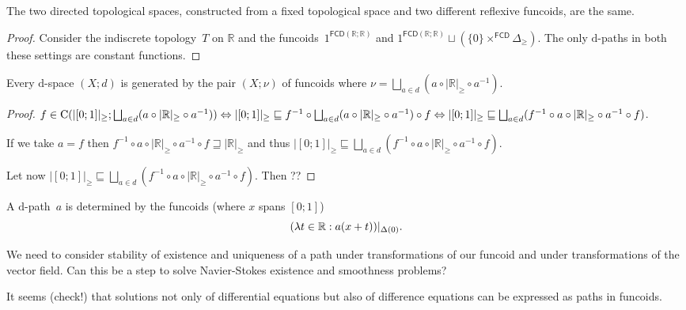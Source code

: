 \begin{example}
The two directed topological spaces, constructed from a fixed topological space and two different reflexive funcoids,
are the same.
\end{example}

\begin{proof}
Consider the indiscrete topology~$T$ on $\mathbb{R}$ and the funcoids~$1^{\mathsf{FCD}(\mathbb{R};\mathbb{R})}$
and $1^{\mathsf{FCD}(\mathbb{R};\mathbb{R})}\sqcup(\{0\}\times^{\mathsf{FCD}} \Delta_{\geq})$.
The only $\mathrm{d}$-paths in both these settings are constant functions.
\end{proof}

\begin{conjecture}
Every $\mathrm{d}$-space $(X;d)$ is generated by the pair $(X;\nu)$ of funcoids where
$\nu = \bigsqcup_{a\in d}(a\circ |\mathbb{R}|_{\geq}\circ a^{-1})$.
\end{conjecture}

\begin{proof}
$f\in\continuous(|[0;1]|_{\geq}; \bigsqcup_{a\in d}(a\circ |\mathbb{R}|_{\geq}\circ a^{-1})) \Leftrightarrow
|[0;1]|_{\geq}\sqsubseteq f^{-1}\circ\bigsqcup_{a\in d}(a\circ |\mathbb{R}|_{\geq}\circ a^{-1})\circ f \Leftrightarrow
|[0;1]|_{\geq}\sqsubseteq \bigsqcup_{a\in d}(f^{-1}\circ a\circ |\mathbb{R}|_{\geq}\circ a^{-1}\circ f)$.

If we take $a=f$ then $f^{-1}\circ a\circ |\mathbb{R}|_{\geq}\circ a^{-1}\circ f \sqsupseteq |\mathbb{R}|_{\geq}$ and thus
$|[0;1]|_{\geq}\sqsubseteq \bigsqcup_{a\in d}(f^{-1}\circ a\circ |\mathbb{R}|_{\geq}\circ a^{-1}\circ f)$.

Let now $|[0;1]|_{\geq}\sqsubseteq \bigsqcup_{a\in d}(f^{-1}\circ a\circ |\mathbb{R}|_{\geq}\circ a^{-1}\circ f)$. Then ??
\end{proof}

\begin{conjecture}
A $\mathrm{d}$-path~$a$ is determined by the funcoids (where $x$ spans $[0;1]$)
\[ (\lambda t\in\mathbb{R}:a(x+t))|_{\Delta(0)}. \]
\end{conjecture}

We need to consider stability of existence and uniqueness of a path under transformations of our funcoid and
under transformations of the vector field. Can this be a step to solve Navier-Stokes existence and smoothness problems?

It seems (check!) that solutions not only of differential equations but also of difference equations can be
expressed as paths in funcoids.